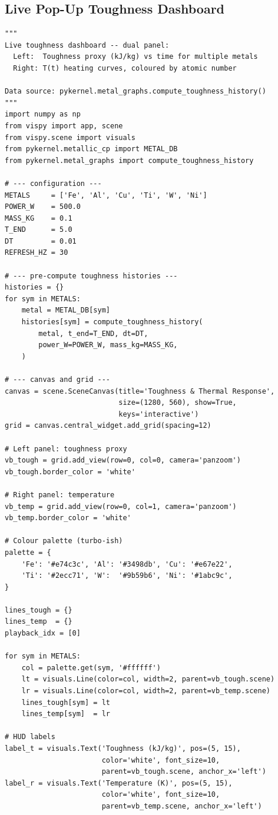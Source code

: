 \documentclass[11pt,a4paper]{article}
\begin{document}
\subsection{Live Pop-Up Toughness Dashboard}

\begin{lstlisting}[title={\textbf{Live VisPy toughness \& thermal dashboard (dual-panel)}}]
"""
Live toughness dashboard -- dual panel:
  Left:  Toughness proxy (kJ/kg) vs time for multiple metals
  Right: T(t) heating curves, coloured by atomic number

Data source: pykernel.metal_graphs.compute_toughness_history()
"""
import numpy as np
from vispy import app, scene
from vispy.scene import visuals
from pykernel.metallic_cp import METAL_DB
from pykernel.metal_graphs import compute_toughness_history

# --- configuration ---
METALS     = ['Fe', 'Al', 'Cu', 'Ti', 'W', 'Ni']
POWER_W    = 500.0
MASS_KG    = 0.1
T_END      = 5.0
DT         = 0.01
REFRESH_HZ = 30

# --- pre-compute toughness histories ---
histories = {}
for sym in METALS:
    metal = METAL_DB[sym]
    histories[sym] = compute_toughness_history(
        metal, t_end=T_END, dt=DT,
        power_W=POWER_W, mass_kg=MASS_KG,
    )

# --- canvas and grid ---
canvas = scene.SceneCanvas(title='Toughness & Thermal Response',
                           size=(1280, 560), show=True,
                           keys='interactive')
grid = canvas.central_widget.add_grid(spacing=12)

# Left panel: toughness proxy
vb_tough = grid.add_view(row=0, col=0, camera='panzoom')
vb_tough.border_color = 'white'

# Right panel: temperature
vb_temp = grid.add_view(row=0, col=1, camera='panzoom')
vb_temp.border_color = 'white'

# Colour palette (turbo-ish)
palette = {
    'Fe': '#e74c3c', 'Al': '#3498db', 'Cu': '#e67e22',
    'Ti': '#2ecc71', 'W':  '#9b59b6', 'Ni': '#1abc9c',
}

lines_tough = {}
lines_temp  = {}
playback_idx = [0]

for sym in METALS:
    col = palette.get(sym, '#ffffff')
    lt = visuals.Line(color=col, width=2, parent=vb_tough.scene)
    lr = visuals.Line(color=col, width=2, parent=vb_temp.scene)
    lines_tough[sym] = lt
    lines_temp[sym]  = lr

# HUD labels
label_t = visuals.Text('Toughness (kJ/kg)', pos=(5, 15),
                       color='white', font_size=10,
                       parent=vb_tough.scene, anchor_x='left')
label_r = visuals.Text('Temperature (K)', pos=(5, 15),
                       color='white', font_size=10,
                       parent=vb_temp.scene, anchor_x='left')


\end{lstlisting}
\end{document}
